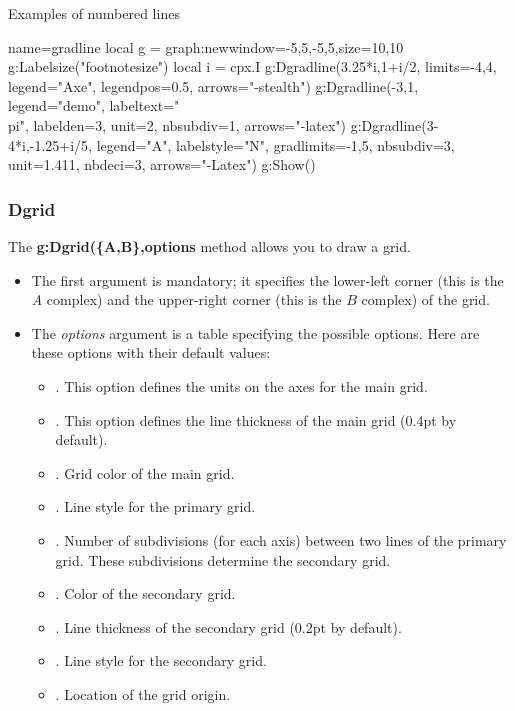 \begin{demo}{Examples of numbered lines}
\begin{luadraw}{name=gradline}
local g = graph:new{window={-5,5,-5,5},size={10,10}}
g:Labelsize("footnotesize")
local i = cpx.I
g:Dgradline({3.25*i,1+i/2}, {limits={-4,4}, legend="Axe", legendpos=0.5, arrows="-stealth"})
g:Dgradline({-3,1}, {legend="demo", labeltext="\\pi", labelden=3, unit=2, nbsubdiv=1, arrows="-latex"})
g:Dgradline({3-4*i,-1.25+i/5}, {legend="A", labelstyle="N", gradlimits={-1,5}, nbsubdiv=3, unit=1.411, nbdeci=3, arrows="-Latex"})
g:Show()
\end{luadraw}
\end{demo}

\subsubsection{Dgrid}

The \textbf{g:Dgrid(\{A,B\},options} method allows you to draw a grid.
\begin{itemize}
    \item The first argument is mandatory; it specifies the lower-left corner (this is the \emph{A} complex) and the upper-right corner (this is the $B$ complex) of the grid.
    \item The \emph{options} argument is a table specifying the possible options. Here are these options with their default values:
\begin{itemize}
    \item {}. ​​This option defines the units on the axes for the main grid.
    \item {}. This option defines the line thickness of the main grid (0.4pt by default).
    \item {}. Grid color of the main grid.
    \item {}. Line style for the primary grid.
    \item {}. Number of subdivisions (for each axis) between two lines of the primary grid. These subdivisions determine the secondary grid.
    \item {}. Color of the secondary grid.
    \item {}. Line thickness of the secondary grid (0.2pt by default).
    \item {}. Line style for the secondary grid.
    \item {}. Location of the grid origin.
\end{itemize}
\end{itemize}

